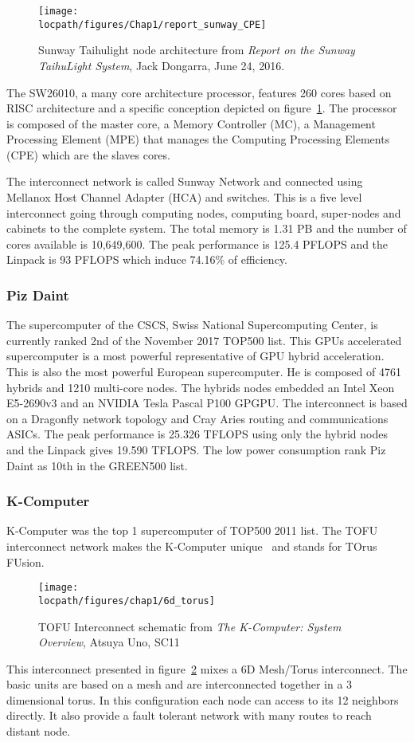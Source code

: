 \begin{figure}[t!]
\centering
\texttt{[image: \\locpath/figures/Chap1/report\_sunway\_CPE]}
\caption{Sunway Taihulight node architecture from \textit{Report on the Sunway TaihuLight System}, Jack Dongarra, June 24, 2016.}
\label{fig:chap1_report_sunway_CPE}
\end{figure}

The SW26010, a many core architecture processor, features 260 cores based on RISC architecture and a specific conception depicted on figure~\ref{fig:chap1_report_sunway_CPE}. 
The processor is composed of the master core, a Memory Controller (MC), a Management Processing Element (MPE) that manages the Computing Processing Elements (CPE) which are the slaves cores. 

The interconnect network is called Sunway Network and connected using Mellanox Host Channel Adapter (HCA) and switches. 
This is a five level interconnect going through computing nodes, computing board, super-nodes and cabinets to the complete system.
The total memory is 1.31 PB and the number of cores available is 10,649,600.
The peak performance is 125.4 PFLOPS and the Linpack is 93 PFLOPS which induce 74.16\% of efficiency. 

\subsubsection{Piz Daint}
The supercomputer of the CSCS, Swiss National Supercomputing Center, is currently ranked 2nd of the November 2017 TOP500 list. 
This GPUs accelerated supercomputer is a most powerful representative of GPU hybrid acceleration.
This is also the most powerful European supercomputer. 
He is composed of 4761 hybrids and 1210 multi-core nodes. 
The hybrids nodes embedded an Intel Xeon E5-2690v3 and an NVIDIA Tesla Pascal P100 GPGPU. 
The interconnect is based on a Dragonfly network topology and Cray Aries routing and communications ASICs. 
The peak performance is 25.326 TFLOPS using only the hybrid nodes and the Linpack gives 19.590 TFLOPS.
The low power consumption rank Piz Daint as 10th in the GREEN500 list. 

\subsubsection{K-Computer}
K-Computer was the top 1 supercomputer of TOP500 2011 list. 
The TOFU interconnect network makes the K-Computer unique~\cite{ajima2009tofu} and stands for TOrus FUsion.
\begin{figure}[t!]
\begin{center}
\texttt{[image: \\locpath/figures/chap1/6d\_torus]}
\end{center}
\caption{TOFU Interconnect schematic from \textit{The K-Computer: System Overview}, Atsuya Uno, SC11}
\label{fig:1_HPC:tofu}
\end{figure}
This interconnect presented in figure~\ref{fig:1_HPC:tofu} mixes a 6D Mesh/Torus interconnect.
The basic units are based on a mesh and are interconnected together in a 3 dimensional torus. 
In this configuration each node can access to its 12 neighbors directly. 
It also provide a fault tolerant network with many routes to reach distant node. 

